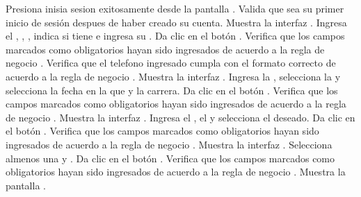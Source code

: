 \begin{UCtrayectoria}
	\UCpaso [\UCactor] Presiona inisia sesion exitosamente desde la pantalla .
    \UCpaso [\UCsist] Valida que sea su primer inicio de sesión despues de haber creado su cuenta.
	\UCpaso [\UCsist] Muestra la interfaz .
	\UCpaso [\UCactor] Ingresa el , , , 
	indica si tiene  e ingresa su .\label{cu07-grl1}
	\UCpaso [\UCactor] Da clic en el botón .
	\UCpaso [\UCsist] Verifica que los campos marcados como obligatorios hayan sido ingresados de acuerdo a la
	regla de negocio .
	\UCpaso [\UCsist] Verifica que el telefono ingresado cumpla con el formato correcto de acuerdo a la regla de negocio  .  
	\UCpaso [\UCsist] Muestra la interfaz .
	\UCpaso [\UCactor] Ingresa la , selecciona la  y selecciona
	la fecha en la que  y  la carrera.
	\UCpaso [\UCactor] Da clic en el botón .
	\UCpaso [\UCsist] Verifica que los campos marcados como obligatorios hayan sido ingresados de acuerdo a la
	regla de negocio .\label{cu07-grl2} 
	\UCpaso [\UCsist] Muestra la interfaz .
	\UCpaso [\UCactor] Ingresa el  , el  y selecciona
	el   deseado.
	\UCpaso [\UCactor] Da clic en el botón .
	\UCpaso [\UCsist] Verifica que los campos marcados como obligatorios hayan sido ingresados de acuerdo a la
	regla de negocio .\label{cu07-grl3} 
	\UCpaso [\UCsist] Muestra la interfaz .
	\UCpaso [\UCactor] Selecciona almenos una  y .
	\UCpaso [\UCactor] Da clic en el botón .
	\UCpaso [\UCsist] Verifica que los campos marcados como obligatorios hayan sido ingresados de acuerdo a la
	regla de negocio .\label{cu07-grl4} 
	\UCpaso [\UCsist] Muestra la pantalla . %
\end{UCtrayectoria}

